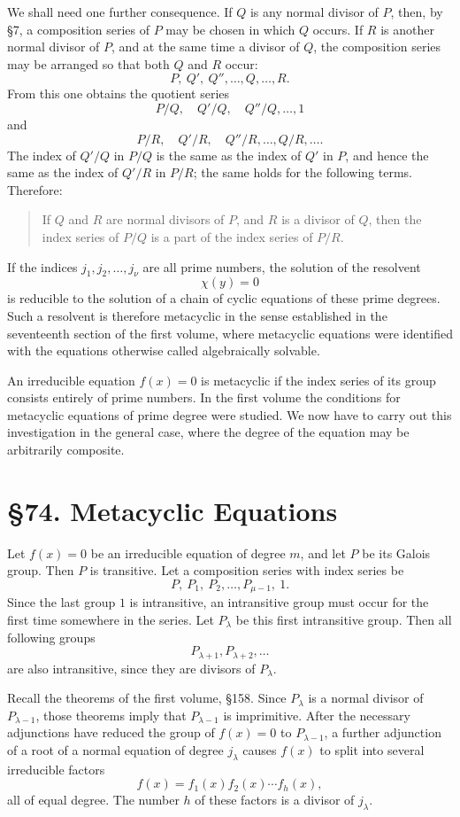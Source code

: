 \documentclass[12pt,a4paper]{article}
\newcommand{\webersection}[2]{\section*{\S #1. #2}\addcontentsline{toc}{section}{\S #1. #2}}
\begin{document}
We shall need one further consequence.  If \(Q\) is any normal divisor of \(P\), then, by \S 7, a composition series of \(P\) may be chosen in which \(Q\) occurs.  If \(R\) is another normal divisor of \(P\), and at the same time a divisor of \(Q\), the composition series may be arranged so that both \(Q\) and \(R\) occur:
\[
 P,\ Q',\ Q'',\ldots,Q,\ldots,R .
\]
From this one obtains the quotient series
\[
 P/Q,\quad Q'/Q,\quad Q''/Q,\ldots,1
\]
and
\[
 P/R,\quad Q'/R,\quad Q''/R,\ldots,Q/R,\ldots .
\]
The index of \(Q'/Q\) in \(P/Q\) is the same as the index of \(Q'\) in \(P\), and hence the same as the index of \(Q'/R\) in \(P/R\); the same holds for the following terms.  Therefore:

\begin{quote}
If \(Q\) and \(R\) are normal divisors of \(P\), and \(R\) is a divisor of \(Q\), then the index series of \(P/Q\) is a part of the index series of \(P/R\).
\end{quote}

If the indices \(j_1,j_2,\ldots,j_\nu\) are all prime numbers, the solution of the resolvent
\[
 \chi(y)=0
\]
is reducible to the solution of a chain of cyclic equations of these prime degrees.  Such a resolvent is therefore metacyclic in the sense established in the seventeenth section of the first volume, where metacyclic equations were identified with the equations otherwise called algebraically solvable.

An irreducible equation \(f(x)=0\) is metacyclic if the index series of its group consists entirely of prime numbers.  In the first volume the conditions for metacyclic equations of prime degree were studied.  We now have to carry out this investigation in the general case, where the degree of the equation may be arbitrarily composite.

\webersection{74}{Metacyclic Equations}

Let \(f(x)=0\) be an irreducible equation of degree \(m\), and let \(P\) be its Galois group.  Then \(P\) is transitive.  Let a composition series with index series be
\[
 P,\ P_1,\ P_2,\ldots,P_{\mu-1},\ 1.
\]
Since the last group \(1\) is intransitive, an intransitive group must occur for the first time somewhere in the series.  Let \(P_\lambda\) be this first intransitive group.  Then all following groups
\[
 P_{\lambda+1},P_{\lambda+2},\ldots
\]
are also intransitive, since they are divisors of \(P_\lambda\).

Recall the theorems of the first volume, \S 158.  Since \(P_\lambda\) is a normal divisor of \(P_{\lambda-1}\), those theorems imply that \(P_{\lambda-1}\) is imprimitive.  After the necessary adjunctions have reduced the group of \(f(x)=0\) to \(P_{\lambda-1}\), a further adjunction of a root of a normal equation of degree \(j_\lambda\) causes \(f(x)\) to split into several irreducible factors
\[
 f(x)=f_1(x)f_2(x)\cdots f_h(x),
\]
all of equal degree.  The number \(h\) of these factors is a divisor of \(j_\lambda\).
\end{document}
